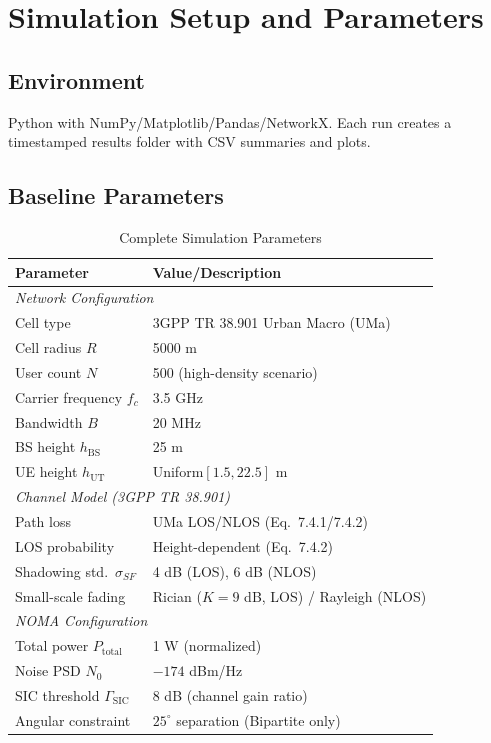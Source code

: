 \section{Simulation Setup and Parameters}
\label{sec: Simulation}
\subsection{Environment}
Python with NumPy/Matplotlib/Pandas/NetworkX. Each run creates a timestamped results folder with CSV summaries and plots.

\subsection{Baseline Parameters}
\begin{table}[!t]
\centering
\caption{Complete Simulation Parameters}
\label{tab:sim_params}
\begin{tabular}{l l}
\toprule
\textbf{Parameter} & \textbf{Value/Description} \\
\midrule
\multicolumn{2}{l}{\textit{Network Configuration}} \\
Cell type & 3GPP TR 38.901 Urban Macro (UMa) \\
Cell radius $R$ & 5000 m \\
User count $N$ & 500 (high-density scenario) \\
Carrier frequency $f_c$ & 3.5 GHz \\
Bandwidth $B$ & 20 MHz \\
BS height $h_{\mathrm{BS}}$ & 25 m \\
UE height $h_{\mathrm{UT}}$ & Uniform$[1.5, 22.5]$ m \\
\midrule
\multicolumn{2}{l}{\textit{Channel Model (3GPP TR 38.901)}} \\
Path loss & UMa LOS/NLOS (Eq.~7.4.1/7.4.2) \\
LOS probability & Height-dependent (Eq.~7.4.2) \\
Shadowing std.\ $\sigma_{SF}$ & 4 dB (LOS), 6 dB (NLOS) \\
Small-scale fading & Rician ($K=9$ dB, LOS) / Rayleigh (NLOS) \\
\midrule
\multicolumn{2}{l}{\textit{NOMA Configuration}} \\
Total power $P_{\mathrm{total}}$ & 1 W (normalized) \\
Noise PSD $N_0$ & $-174$ dBm/Hz \\
SIC threshold $\Gamma_{\mathrm{SIC}}$ & 8 dB (channel gain ratio) \\
Angular constraint & $25^\circ$ separation (Bipartite only) \\

\end{tabular}
\end{table}
